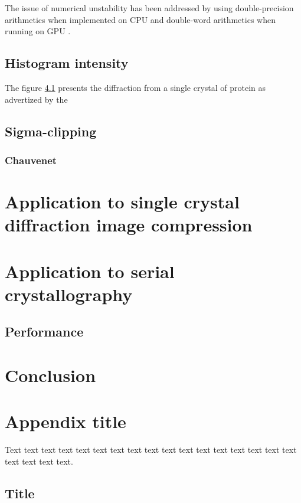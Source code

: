 \documentclass[preprint]{iucr}              %
\begin{document}
The issue of numerical unstability has been addressed by using double-precision arithmetics when implemented on CPU and double-word arithmetics when running on GPU \cite{double_word}.

\subsection{Histogram intensity }

The figure \ref{} presents the diffraction from a single crystal of protein  as advertized by the  

\subsection{Sigma-clipping}
\cite{Sivia2006}
\subsubsection{Chauvenet}




\section{Application to single crystal diffraction image compression}

\section{Application to serial crystallography}

\subsection{Performance}
\section{Conclusion}

\appendix
\section{Appendix title}

Text text text text text text text text text text text text text text
text text text text text text text.

\subsection{Title}
\end{document}
